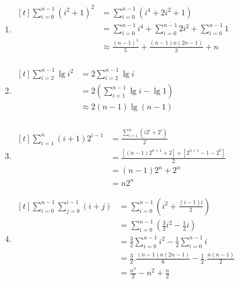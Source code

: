 \documentclass[12pt, letterpaper]{article}
\begin{document}
\begin{enumerate}
	\item $ \begin{aligned}[t]
			      \sum^{n - 1}_{i = 0} {(i^2 + 1)}^2
			       & = \sum^{n - 1}_{i = 0} (i^4 + 2i^2 + 1)                                         \\
			       & = \sum^{n - 1}_{i = 0} i^4 + \sum^{n - 1}_{i = 0} 2i^2 + \sum^{n - 1}_{i = 0} 1 \\
                   & \approx \frac{{(n-1)}^5}{5} + \frac{(n - 1)n(2n - 1)}{3} + n                    \\
		      \end{aligned} $

	\item $ \begin{aligned}[t]
			      \sum^{n - 1}_{i = 2} \lg{i^2}
			       & = 2 \sum^{n - 1}_{i = 2} \lg{i}            \\
			       & = 2 (\sum^{n - 1}_{i = 1} \lg{i} - \lg{1}) \\
			       & \approx 2(n - 1)\lg (n-1)                  \\
		      \end{aligned} $

	\item $ \begin{aligned}[t]
			      \sum^{n}_{i = 1} (i + 1)2^{i - 1}
			       & = \frac{\sum^{n}_{i = 1} (i2^i + 2^i)}{2}                  \\
			       & = \frac{[(n - 1)2^{n + 1} + 2] + [2^{n + 1} - 1 - 2^0]}{2} \\
			       & = (n - 1)2^n + 2^n                                         \\
			       & = n2^n
		      \end{aligned} $

	\item $ \begin{aligned}[t]
			      \sum^{n - 1}_{i = 0} \sum^{i - 1}_{j = 0} (i + j)
			       & = \sum^{n - 1}_{i = 0} (i^2 + \frac{(i - 1)i}{2})                           \\
			       & = \sum^{n - 1}_{i = 0} (\frac{3}{2} i^2 - \frac{1}{2} i)                    \\
			       & = \frac{3}{2} \sum^{n - 1}_{i = 0} i^2 - \frac{1}{2} \sum^{n - 1}_{i = 0} i \\
			       & = \frac{3}{2}.\frac{(n - 1)n(2n - 1)}{6} - \frac{1}{2}.\frac{n(n - 1)}{2}   \\
			       & = \frac{n^3}{2} - n^2 + \frac{n}{2}                                         \\
		      \end{aligned} $
\end{enumerate}
\end{document}
